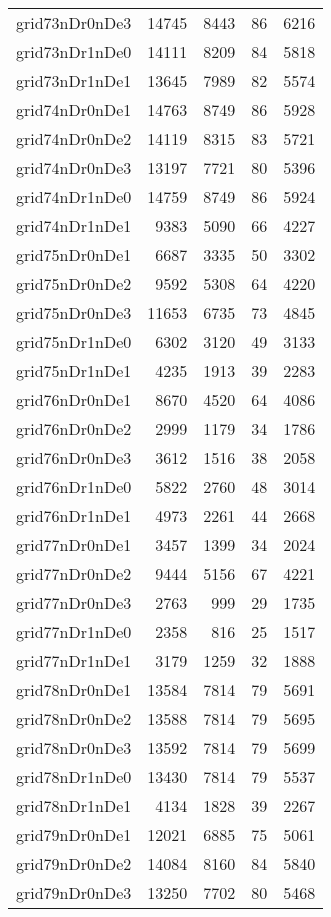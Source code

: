 \begin{longtable}{lrrrr}
grid73nDr0nDe3 & 14745 & 8443 & 86 & 6216 \\
grid73nDr1nDe0 & 14111 & 8209 & 84 & 5818 \\
grid73nDr1nDe1 & 13645 & 7989 & 82 & 5574 \\
grid74nDr0nDe1 & 14763 & 8749 & 86 & 5928 \\
grid74nDr0nDe2 & 14119 & 8315 & 83 & 5721 \\
grid74nDr0nDe3 & 13197 & 7721 & 80 & 5396 \\
grid74nDr1nDe0 & 14759 & 8749 & 86 & 5924 \\
grid74nDr1nDe1 & 9383 & 5090 & 66 & 4227 \\
grid75nDr0nDe1 & 6687 & 3335 & 50 & 3302 \\
grid75nDr0nDe2 & 9592 & 5308 & 64 & 4220 \\
grid75nDr0nDe3 & 11653 & 6735 & 73 & 4845 \\
grid75nDr1nDe0 & 6302 & 3120 & 49 & 3133 \\
grid75nDr1nDe1 & 4235 & 1913 & 39 & 2283 \\
grid76nDr0nDe1 & 8670 & 4520 & 64 & 4086 \\
grid76nDr0nDe2 & 2999 & 1179 & 34 & 1786 \\
grid76nDr0nDe3 & 3612 & 1516 & 38 & 2058 \\
grid76nDr1nDe0 & 5822 & 2760 & 48 & 3014 \\
grid76nDr1nDe1 & 4973 & 2261 & 44 & 2668 \\
grid77nDr0nDe1 & 3457 & 1399 & 34 & 2024 \\
grid77nDr0nDe2 & 9444 & 5156 & 67 & 4221 \\
grid77nDr0nDe3 & 2763 & 999 & 29 & 1735 \\
grid77nDr1nDe0 & 2358 & 816 & 25 & 1517 \\
grid77nDr1nDe1 & 3179 & 1259 & 32 & 1888 \\
grid78nDr0nDe1 & 13584 & 7814 & 79 & 5691 \\
grid78nDr0nDe2 & 13588 & 7814 & 79 & 5695 \\
grid78nDr0nDe3 & 13592 & 7814 & 79 & 5699 \\
grid78nDr1nDe0 & 13430 & 7814 & 79 & 5537 \\
grid78nDr1nDe1 & 4134 & 1828 & 39 & 2267 \\
grid79nDr0nDe1 & 12021 & 6885 & 75 & 5061 \\
grid79nDr0nDe2 & 14084 & 8160 & 84 & 5840 \\
grid79nDr0nDe3 & 13250 & 7702 & 80 & 5468 \\

\end{longtable}
